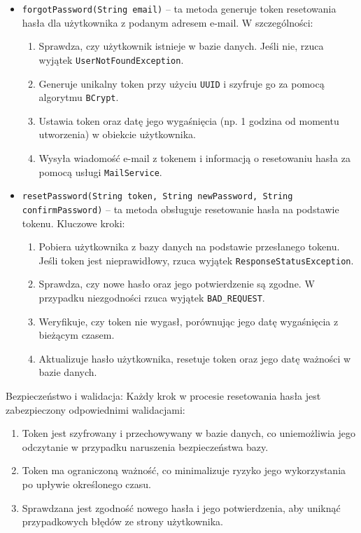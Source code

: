 \begin{itemize}
    \item \texttt{forgotPassword(String email)} -- ta metoda generuje token resetowania hasła dla użytkownika z podanym adresem e-mail. W szczególności:
    \begin{enumerate}
        \item Sprawdza, czy użytkownik istnieje w bazie danych. Jeśli nie, rzuca wyjątek \texttt{UserNotFoundException}.
        \item Generuje unikalny token przy użyciu \texttt{UUID} i szyfruje go za pomocą algorytmu \texttt{BCrypt}.
        \item Ustawia token oraz datę jego wygaśnięcia (np. 1 godzina od momentu utworzenia) w obiekcie użytkownika.
        \item Wysyła wiadomość e-mail z tokenem i informacją o resetowaniu hasła za pomocą usługi \texttt{MailService}.
    \end{enumerate}

    \item \texttt{resetPassword(String token, String newPassword, String confirmPassword)} -- ta metoda obsługuje resetowanie hasła na podstawie tokenu. Kluczowe kroki:
    \begin{enumerate}
        \item Pobiera użytkownika z bazy danych na podstawie przesłanego tokenu. Jeśli token jest nieprawidłowy, rzuca wyjątek \texttt{ResponseStatusException}.
        \item Sprawdza, czy nowe hasło oraz jego potwierdzenie są zgodne. W przypadku niezgodności rzuca wyjątek \texttt{BAD\_REQUEST}.
        \item Weryfikuje, czy token nie wygasł, porównując jego datę wygaśnięcia z bieżącym czasem.
        \item Aktualizuje hasło użytkownika, resetuje token oraz jego datę ważności w bazie danych.
    \end{enumerate}
\end{itemize}


Bezpieczeństwo i walidacja:
Każdy krok w procesie resetowania hasła jest zabezpieczony odpowiednimi walidacjami:
\begin{enumerate}
    \item Token jest szyfrowany i przechowywany w bazie danych, co uniemożliwia jego odczytanie w przypadku naruszenia bezpieczeństwa bazy.
    \item Token ma ograniczoną ważność, co minimalizuje ryzyko jego wykorzystania po upływie określonego czasu.
    \item Sprawdzana jest zgodność nowego hasła i jego potwierdzenia, aby uniknąć przypadkowych błędów ze strony użytkownika.
\end{enumerate}

